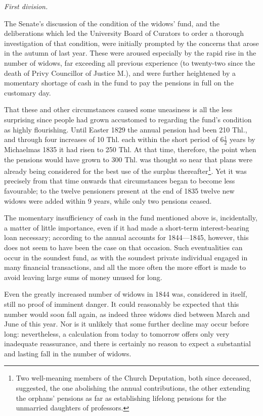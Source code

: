 \begin{center}\textit{First division.}\end{center}
\noindent\hspace*{\parindent}The Senate's discussion of the condition of the widows' fund, and the deliberations which led the University Board of Curators to order a thorough investigation of that condition, were initially prompted by the concerns that arose in the autumn of last year. These were aroused especially by the rapid rise in the number of widows, far exceeding all previous experience (to twenty-two since the death of Privy Councillor of Justice M.), and were further heightened by a momentary shortage of cash in the fund to pay the pensions in full on the customary day.

That these and other circumstances caused some uneasiness is all the less surprising since people had grown accustomed to regarding the fund's condition as highly flourishing. Until Easter 1829 the annual pension had been 210 Thl., and through four increases of 10 Thl. each within the short period of \(6\tfrac12\) years by Michaelmas 1835 it had risen to 250 Thl. At that time, therefore, the point when the pensions would have grown to 300 Thl. was thought so near that plans were already being considered for the best use of the surplus thereafter\footnote{Two well-meaning members of the Church Deputation, both since deceased, suggested, the one abolishing the annual contributions, the other extending the orphans' pensions as far as establishing lifelong pensions for the unmarried daughters of professors.}. Yet it was precisely from that time onwards that circumstances began to become less favourable; to the twelve pensioners present at the end of 1835 twelve new widows were added within 9 years, while only two pensions ceased.

The momentary insufficiency of cash in the fund mentioned above is, incidentally, a matter of little importance, even if it had made a short-term interest-bearing loan necessary; according to the annual accounts for 1844—1845, however, this does not seem to have been the case on that occasion. Such eventualities can occur in the soundest fund, as with the soundest private individual engaged in many financial transactions, and all the more often the more effort is made to avoid leaving large sums of money unused for long.

Even the greatly increased number of widows in 1844 was, considered in itself, still no proof of imminent danger. It could reasonably be expected that this number would soon fall again, as indeed three widows died between March and June of this year. Nor is it unlikely that some further decline may occur before long: nevertheless, a calculation from today to tomorrow offers only very inadequate reassurance, and there is certainly no reason to expect a substantial and lasting fall in the number of widows.

